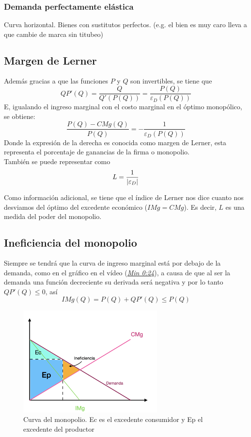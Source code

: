 \subsubsection{Demanda perfectamente elástica}
Curva horizontal. Bienes con sustitutos perfectos. (e.g. el bien es muy caro lleva a que cambie de marca sin titubeo)


\subsection{Margen de Lerner}
Además gracias a que las funciones $P$ y $Q$ son invertibles, se tiene que
\[QP'(Q) = \frac{Q}{Q'(P(Q))} = \frac{P(Q)}{\varepsilon_D(P(Q))}\]
E, igualando el ingreso marginal con el costo marginal en el óptimo monopólico, se obtiene:
\[\frac{P(Q) - CMg(Q)}{P(Q)} = - \frac{1}{\varepsilon_D(P(Q))}\]
Donde la expresión de la derecha es conocida como margen de Lerner, esta representa el porcentaje de ganancias de la firma o monopolio.\\

También se puede representar como
\[L = \frac{1}{\abs{\varepsilon_D}}\]

Como información adicional, se tiene que el índice de Lerner nos dice cuanto nos desviamos del óptimo del excedente económico ($IMg = CMg$). Es decir, $L$ es una medida del poder del monopolio.

\subsection{Ineficiencia del monopolio}
Siempre se tendrá que la curva de ingreso marginal está por debajo de la demanda, como en el gráfico en el vídeo (\textit{\href{https://youtu.be/VMXx_u8HF00?t=24}{Min 0:24}}), a causa de que al ser la demanda una función decreciente su derivada será negativa y por lo tanto $QP'(Q) \leq 0$, así
\[IMg(Q) = P(Q) + QP'(Q) \leq P(Q)\]

\begin{figure}[H]
    \centering
    \includegraphics[width=0.65\textwidth]{Modulo_5/ineficencia_monopolio.png}
    \caption{Curva del monopolio. Ec es el excedente consumidor y Ep el excedente del productor}
    \label{fig:inef_monopo}
\end{figure}

